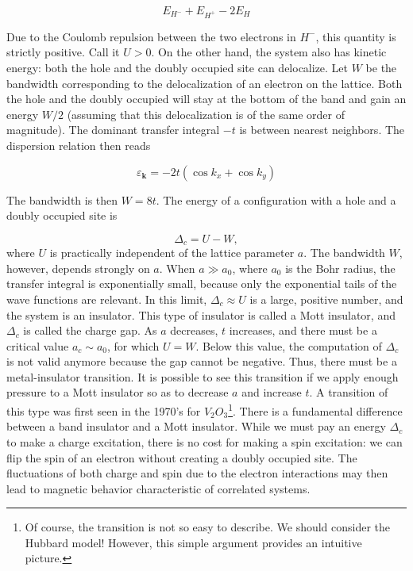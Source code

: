 \begin{equation}
E_{H^-} + E_{H^+} - 2 E_H 
\end{equation}

Due to the Coulomb repulsion between the two electrons in $H^-$, this quantity is strictly positive.
Call it $U > 0$.
On the other hand, the system also has kinetic energy: both the hole and the doubly occupied site can delocalize.
Let $W$ be the bandwidth corresponding to the delocalization of an electron on the lattice.
Both the hole and the doubly occupied will stay at the bottom of the band and gain an energy $W/2$ (assuming that this delocalization is of the same order of magnitude).
The dominant transfer integral $-t$ is between nearest neighbors.
The dispersion relation then reads

\begin{equation}
\varepsilon_{\bm k} = -2 t ( \cos k_x + \cos k_y ) 
\end{equation}

The bandwidth is then $W = 8 t$.
The energy of a configuration with a hole and a doubly occupied site is

\begin{equation}
\Delta_c = U - W ,
\end{equation}
where $U$ is practically independent of the lattice parameter $a$.
The bandwidth $W$, however, depends strongly on $a$.
When $a \gg a_0$, where $a_0$ is the Bohr radius, the transfer integral is exponentially small, because only the exponential tails of the wave functions are relevant.
In this limit, $\Delta_c \approx U$ is a large, positive number, and the system is an insulator.
This type of insulator is called a Mott insulator, and $\Delta_c$ is called the charge gap.
As $a$ decreases, $t$ increases, and there must be a critical value $a_c \sim a_0$, for which $U = W$.
Below this value, the computation of $\Delta_c$ is not valid anymore because the gap cannot be negative.
Thus, there must be a metal-insulator transition.
It is possible to see this transition if we apply enough pressure to a Mott insulator so as to decrease $a$ and increase $t$.
A transition of this type was first seen in the 1970's for $V_2 O_3$\footnote{Of course, the transition is not so easy to describe. We should consider the Hubbard model!
However, this simple argument provides an intuitive picture.}.
There is a fundamental difference between a band insulator and a Mott insulator.
While we must pay an energy $\Delta_c$ to make a charge excitation, there is no cost for making a spin excitation: we can flip the spin of an electron without creating a doubly occupied site.
The fluctuations of both charge and spin due to the electron interactions may then lead to magnetic behavior characteristic of correlated  systems.

